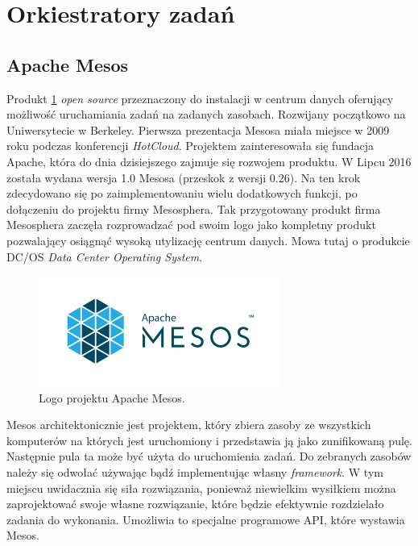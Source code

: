 \documentclass[10pt,a4paper,titlepage,twoside]{report}
\begin{document}
\newpage

\section{Orkiestratory zadań}

\subsection{Apache Mesos}

Produkt \cite{ad34} \ref{mesos_logo} \textit{open source} przeznaczony do instalacji w centrum danych oferujący możliwość uruchamiania zadań na zadanych zasobach. Rozwijany początkowo na Uniwersytecie w Berkeley. Pierwsza prezentacja Mesosa miała miejsce w 2009 roku podczas konferencji \textit{HotCloud}. Projektem zainteresowała się fundacja Apache, która do dnia dzisiejszego zajmuje się rozwojem produktu. W Lipcu 2016 została wydana wersja 1.0 Mesosa (przeskok z wersji 0.26). Na ten krok zdecydowano się po zaimplementowaniu wielu dodatkowych funkcji, po dołączeniu do projektu firmy Mesosphera. Tak przygotowany produkt firma Mesosphera zaczęła rozprowadzać pod swoim logo jako kompletny produkt pozwalający osiągnąć wysoką utylizację centrum danych. Mowa tutaj o produkcie DC/OS \textit{Data Center Operating System}. 

\begin{figure}[!h]
	\centering
	\includegraphics[scale=1]{pics/apache_mesos_logo.png}
	\caption{Logo projektu Apache Mesos.}
	\label{mesos_logo}
\end{figure}

Mesos architektonicznie \cite{ad33} jest projektem, który zbiera zasoby ze wszystkich komputerów na których jest uruchomiony i przedstawia ją jako zunifikowaną pulę. Następnie pula ta może być użyta do uruchomienia zadań. Do zebranych zasobów należy się odwołać używając bądź implementując własny \textit{framework}. W tym miejscu uwidacznia się siła rozwiązania, ponieważ niewielkim wysiłkiem można zaprojektować swoje własne rozwiązanie, które będzie efektywnie rozdzielało zadania do wykonania. Umożliwia to specjalne programowe API, które wystawia Mesos.
\end{document}

